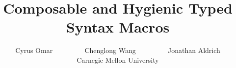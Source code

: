 \documentclass{sig-alternate}[10pt]
\begin{document}
\newtheorem{theorem}{Theorem}
\newtheorem{lemma}{Lemma}
\newtheorem{definition}{Definition}
\newtheorem{property}{Property}
%

\title{Composable and Hygienic Typed Syntax Macros}
%
%
%
%
%

%
\author{
%
%
\alignauthor
Cyrus Omar ~~~~~~~~ Chenglong Wang ~~~~~~~~ Jonathan Aldrich \\ Carnegie Mellon University \\ 
}
\end{document}
